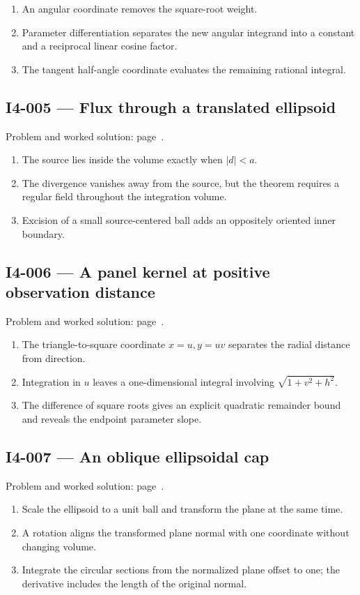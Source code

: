 \documentclass[11pt,oneside,openany]{book}
\begin{document}
\begin{enumerate}
\item An angular coordinate removes the square-root weight.
\item Parameter differentiation separates the new angular integrand into a constant and a reciprocal linear cosine factor.
\item The tangent half-angle coordinate evaluates the remaining rational integral.
\end{enumerate}
\subsection*{I4-005 --- Flux through a translated ellipsoid}
\label{hints:I4-005}
Problem and worked solution: page~\pageref{problem:I4-005}.

\begin{enumerate}
\item The source lies inside the volume exactly when \(|d|<a\).
\item The divergence vanishes away from the source, but the theorem requires a regular field throughout the integration volume.
\item Excision of a small source-centered ball adds an oppositely oriented inner boundary.
\end{enumerate}
\subsection*{I4-006 --- A panel kernel at positive observation distance}
\label{hints:I4-006}
Problem and worked solution: page~\pageref{problem:I4-006}.

\begin{enumerate}
\item The triangle-to-square coordinate \(x=u,y=uv\) separates the radial distance from direction.
\item Integration in \(u\) leaves a one-dimensional integral involving \(\sqrt{1+v^2+h^2}\).
\item The difference of square roots gives an explicit quadratic remainder bound and reveals the endpoint parameter slope.
\end{enumerate}
\subsection*{I4-007 --- An oblique ellipsoidal cap}
\label{hints:I4-007}
Problem and worked solution: page~\pageref{problem:I4-007}.

\begin{enumerate}
\item Scale the ellipsoid to a unit ball and transform the plane at the same time.
\item A rotation aligns the transformed plane normal with one coordinate without changing volume.
\item Integrate the circular sections from the normalized plane offset to one; the derivative includes the length of the original normal.
\end{enumerate}
\end{document}
